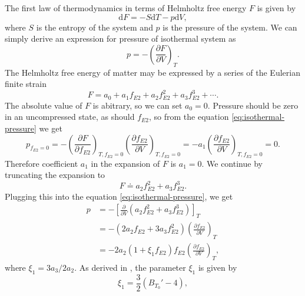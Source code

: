 The first law of thermodynamics in terms of Helmholtz free energy $F$ is
given by
\begin{equation}
  \mathrm{d}F = - S \mathrm{d}T - p \mathrm{d}V,
\end{equation}
where $S$ is the entropy of the system and $p$ is the pressure of the system.
We can simply derive an expression for pressure of isothermal system as
\begin{equation}
  p = - \left(\frac{\partial F}{\partial V}\right)_T.
  \label{eq:isothermal-pressure}
\end{equation}
The Helmholtz free energy of matter may be expressed by a series of the
Eulerian finite strain
\begin{equation}
  F = a_0 + a_1 f_{E2} + a_2 f_{E2}^2 + a_3 f_{E2}^3 + \cdots.
\end{equation}
The absolute value of $F$ is abitrary, so we can set $a_0 = 0$. Pressure
should be zero in an uncompressed state, as should $f_{E2}$, so from the
equation \eqref{eq:isothermal-pressure} we get
\begin{equation}
  p_{f_{E2}=0} = - \left(
    \frac{\partial F}{\partial f_{E2}}
  \right)_{T,f_{E2}=0} \left(
    \frac{\partial f_{E2}}{\partial V}
  \right)_{T, f_{E2}=0} = -a_1 \left(
    \frac{\partial f_{E2}}{\partial V}
  \right)_{T, f_{E2}=0} = 0.
\end{equation}
Therefore coefficient $a_1$ in the expansion of $F$ is $a_1 = 0$. We continue
by truncating the expansion to
\begin{equation}
  F \doteq a_2 f_{E2}^2 + a_3 f_{E2}^3.
\end{equation}
Plugging this into the equation \eqref{eq:isothermal-pressure}, we get
\begin{equation}
\begin{alignedat}{2}
  p &= -\left[
    \frac{\partial}{\partial V}(a_2 f_{E2}^2 + a_3 f_{E2}^3)
  \right]_T \\
  &= - (2 a_2 f_{E2} + 3 a_3 f_{E2}^2)
  \left( \frac{\partial f_{E2}}{\partial V}\right)_T \\
  &= -2 a_2 (1 + \xi_1 f_{E2}) f_{E2} \left(
    \frac{\partial f_{E2}}{\partial V}
  \right)_T,
  \label{eq:pressure}
\end{alignedat}
\end{equation}
where $\xi_1 = 3 a_3/2 a_2$. As derived in \cite{min9120745}, the parameter
$\xi_1$ is given by
\begin{equation}
  \xi_1 = \frac{3}{2}\left(B_{T_0}' - 4\right),
  \label{eqn:xi_1}
\end{equation}
